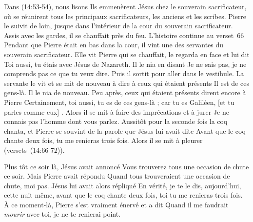 Dans (14:53-54), nous lisons\frcolon{}
 \Og Ils emmenèrent Jésus chez le souverain sacrificateur,
 où se réunirent tous les principaux sacrificateurs,
 les anciens et les scribes.
 Pierre le suivit de loin, jusque dans l'intérieur de la cour
 du souverain sacrificateur.
 Assis avec les gardes, il se chauffait près du feu. \Fg{}
 L'histoire continue au verset~66\frcolon{}
 \Og Pendant que Pierre était en bas dans la cour,
 il vint une des servantes du souverain sacrificateur.
 Elle vit Pierre qui se chauffait, le regarda en face et lui dit\frcolon{}
 Toi aussi, tu étais avec Jésus de Nazareth. Il le nia en disant\frcolon{}
 Je ne sais pas, je ne comprends pas ce que tu veux dire.
 Puis il sortit pour aller dans le vestibule.
 La servante le vit et se mit de nouveau à dire
 à ceux qui étaient présents\frcolon{} Il est de ces \mbox{gens-là}.
 Il le nia de nouveau. Peu après, ceux qui étaient présents
 dirent encore à Pierre\frcolon{} Certainement, toi aussi,
 tu es de ces gens-là ; car tu es Galiléen, [et tu parles comme eux] .
 Alors il se mit à faire des imprécations et à jurer\frcolon{}
 Je ne connais pas l'homme dont vous parlez. Aussitôt pour la seconde fois
 la coq chanta, et Pierre se souvint de la parole que Jésus lui avait dite\frcolon{}
 Avant que le coq chante deux fois, tu me renieras trois fois.
 Alors il se mit à pleurer \Fg{} (versets~(14:66-72)).

Plus tôt ce soir là, Jésus avait annoncé\frcolon{}
 \Og Vous trouverez tous une occasion de chute ce soir. \Fg{}
 Mais Pierre avait répondu\frcolon{}
 \Og Quand tous trouveraient une occasion de chute, moi pas. \Fg{}
 Jésus lui avait alors répliqué\frcolon{}
 \Og En vérité, je te le dis, aujourd'hui, cette nuit même,
 avant que le coq chante deux fois, toi tu me renieras trois fois. \Fg{}
 À ce moment-là, Pierre s'est vraiment énervé et a dit\frcolon{}
 \Og Quand il me faudrait \emph{mourir} avec toi, je ne te renierai point. \Fg{}

